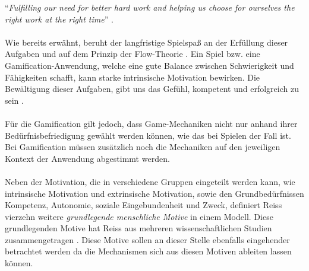 \documentclass[a4paper,12pt,twoside]{scrartcl}
\begin{document}
\enquote{\textit{Fulfilling our need for better hard work and helping us choose for ourselves the right work at the right time}} \cite{Mcgonigal2011}. 
\\\\
Wie bereits erwähnt, beruht der langfristige Spielspaß an der Erfüllung dieser Aufgaben und auf dem Prinzip der Flow-Theorie \cite{Csikszentmihalyi2017}. Ein Spiel bzw. eine Gamification-Anwendung, welche eine gute Balance zwischen Schwierigkeit und Fähigkeiten schafft, kann starke intrinsische Motivation bewirken. Die Bewältigung dieser Aufgaben, gibt uns das Gefühl, kompetent und erfolgreich zu sein \cite{Mcgonigal2011}\cite{Mayer2009}.
\\\\
Für die Gamification gilt jedoch, dass Game-Mechaniken nicht nur anhand ihrer Bedürfnisbefriedigung gewählt werden können, wie das bei Spielen der Fall ist. Bei Gamification müssen zusätzlich noch die Mechaniken auf den jeweiligen Kontext der Anwendung abgestimmt werden.  
\\\\
Neben der Motivation, die in verschiedene Gruppen eingeteilt werden kann, wie intrinsische Motivation und extrinsische Motivation, sowie den Grundbedürfnissen Kompetenz, Autonomie, soziale Eingebundenheit und Zweck, definiert Reiss vierzehn weitere \textit{grundlegende menschliche Motive} in einem Modell. Diese grundlegenden Motive hat Reiss aus mehreren wissenschaftlichen Studien zusammengetragen \cite{Reiss2009}. Diese Motive sollen an dieser Stelle ebenfalls eingehender betrachtet werden da die Mechanismen sich aus diesen Motiven ableiten lassen können.
\end{document}
